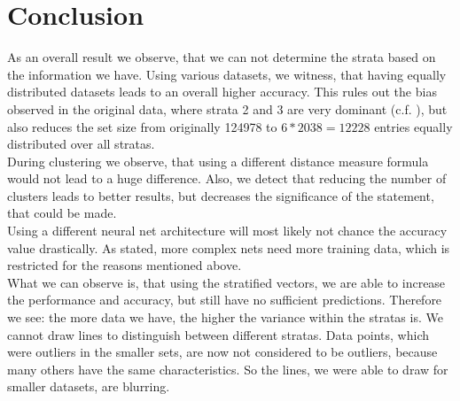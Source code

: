 \section{Conclusion} \label{sec: observation}
	As an overall result we observe, that we can not determine the strata based on the information we have.
	Using various datasets, we witness, that having equally distributed datasets leads to an overall higher accuracy. This rules out the bias observed in the original data, where strata 2 and 3 are very dominant (c.f. ), but also reduces the set size from originally 124978 to $6*2038=12228$ entries equally distributed over all stratas.\\
	During clustering we observe, that using a different distance measure formula would not lead to a huge difference. Also, we detect that reducing the number of clusters leads to better results, but decreases the significance of the statement, that could be made.\\
	Using a different neural net architecture will most likely not chance the accuracy value drastically. As stated, more complex nets need more training data, which is restricted for the reasons mentioned above.\\
	What we can observe is, that using the stratified vectors, we are able to increase the performance and accuracy, but still have no sufficient predictions. Therefore we see: the more data we have, the higher the variance within the stratas is. We cannot draw lines to distinguish between different stratas. Data points, which were outliers in the smaller sets, are now not considered to be outliers, because many others have the same characteristics. So the lines, we were able to draw for smaller datasets, are blurring.\\ %